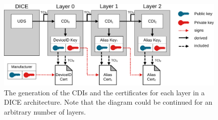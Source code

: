 \begin{figure}[htpb]
  \centering
  \includegraphics[width=1\linewidth]{figures/dice-layers.pdf}
  \caption{The generation of the CDIs and the certificates for each layer in a DICE architecture. Note that the diagram could be continued for an arbitrary number of layers.}\label{fig:dice-layers}
\end{figure}
